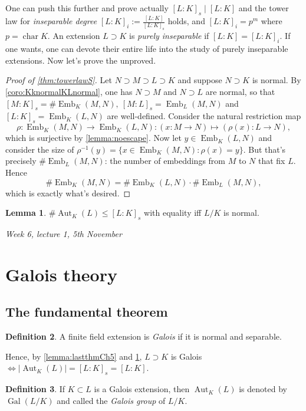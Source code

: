 \documentclass{article}
\newcommand{\Char}{\operatorname{char}}
\newcommand{\Aut}{\operatorname{Aut}}
\newcommand{\Emb}{\operatorname{Emb}}
\newcommand{\Gal}{\operatorname{Gal}}
\theoremstyle{definition}
\newtheorem{defn}{Definition}[subsection]
\newtheorem{lemma}[defn]{Lemma}
\begin{document}
One can push this further and prove actually $[L:K]_s\mid [L:K]$ and the tower law for \textit{inseparable degree} $[L:K]_i:=\frac{[L:K]}{[L:K]_s}$ holds, and $[L:K]_i=p^m$ where $p=\Char K$. An extension $L\supset K$ is \textit{purely inseparable} if $[L:K]=[L:K]_i$. If one wants, one can devote their entire life into the study of purely inseparable extensions. Now let's prove the unproved.

\begin{proof}[Proof of \ref{thm:towerlawS}]
Let $N\supset M\supset L\supset K$ and suppose $N\supset K$ is normal. By \ref{coro:KknormalKLnormal}, one has $N\supset M$ and $N\supset L$ are normal, so that $[M:K]_s=\#\Emb_K(M,N),\ [M:L]_s=\Emb_L(M,N)$ and $[L:K]_s=\Emb_K(L,N)$ are well-defined. Consider the natural restriction map
\[
\rho:\Emb_K(M,N)\rightarrow\Emb_K(L,N):(x:M\rightarrow N)\mapsto(\rho(x):L\rightarrow N),
\]
which is surjective by \ref{lemma:noescape}. Now let $y\in\Emb_K(L,N)$ and consider the size of $\rho^{-1}(y)=\{x\in\Emb_K(M,N):\rho(x)=y\}$. But that's precisely $\#\Emb_L(M,N)$: the number of embeddings from $M$ to $N$ that fix $L$. Hence
\[
\#\Emb_K(M,N) = \#\Emb_K(L,N) \cdot \#\Emb_L(M,N),
\]
which is exactly what's desired.
\end{proof}

\begin{lemma}
\label{lemma:AutKLleqLKs}
$\#\Aut_K(L)\leq [L:K]_s$ with equality iff $L/K$ is normal.
\end{lemma}

\begin{flushright}
\textit{Week 6, lecture 1, 5th November}
\end{flushright}

\section{Galois theory}
\subsection{The fundamental theorem}
\begin{defn}
\label{defn:Galoisext}
A finite field extension is \textit{Galois} if it is normal and separable.
\end{defn}
Hence, by \ref{lemma:lastthmCh5} and \ref{lemma:AutKLleqLKs}, $L\supset K$ is Galois $\iff |\!\Aut_K(L)| =[L:K]_s=[L:K]$.

\begin{defn}
If $K\subset L$ is a Galois extension, then $\Aut_K(L)$ is denoted by $\Gal(L/K)$ and called the \textit{Galois group} of $L/K$.
\end{defn}
\end{document}
